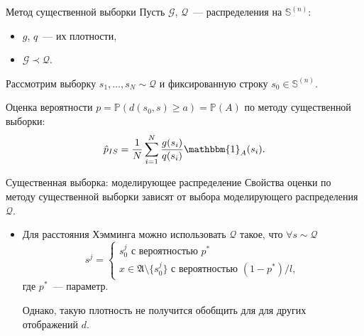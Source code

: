 \documentclass[pdf, 10pt, unicode]{beamer}
\begin{document}
\begin{frame}{Метод существенной выборки}
    Пусть $\mathcal{G}$, $\mathcal{Q}$~--- распределения на $\mathbb{S}^{(n)}$: 
    \begin{itemize}
        \item $g$, $q$~--- их плотности,
        \item $\mathcal{G} \prec \mathcal{Q}$.
    \end{itemize}
    
    Рассмотрим выборку $s_1, \ldots, s_N\sim \mathcal{Q}$ и фиксированную строку $s_0\in\mathbb{S}^{(n)}$. 
    
    Оценка вероятности $p = \mathbb{P}(d(s_0, s)\geq a) = \mathbb{P}(A)$ по методу существенной выборки:
    \begin{equation*}
        \hat{p}_{IS} = \frac{1}{N}\sum\limits_{i = 1}^{N}{\frac{g(s_i)}{q(s_i)}\mathbbm{1}_A(s_i)}.
    \end{equation*}
    
\end{frame}

\begin{frame}{Существенная выборка: моделирующее распределение}
    Свойства оценки по методу существенной выборки зависят от выбора моделирующего распределения $\mathcal{Q}$. 
    \begin{itemize}
        \item Для расстояния Хэмминга можно использовать $\mathcal{Q}$ такое, что $\forall s \sim \mathcal{Q}$
        \begin{equation*}
            s^j = \begin{cases}
                s_0^j \text{ с вероятностью } p^*\\
                x \in \mathfrak{A}\setminus \{s_0^j\} \text{ с вероятностью }(1-p^*) / l,  
            \end{cases}
        \end{equation*}
    где $p^*$~--- параметр.
    
    Однако, такую плотность не получится обобщить для для других отображений $d$.
\end{itemize}

\end{frame}
\end{document}
